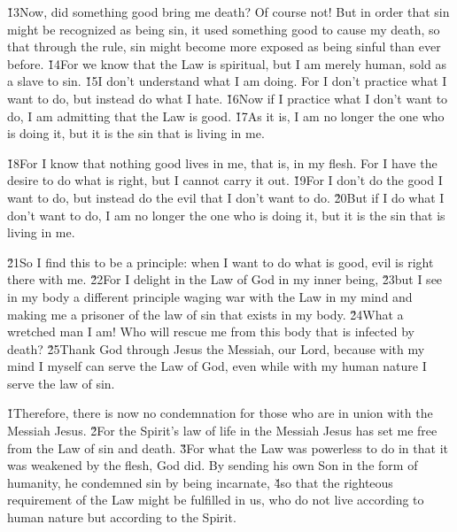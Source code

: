 \v{13}Now, did something good bring me death? Of course not! But in order that sin might be recognized as being sin, it used something good to cause my death, so that through the rule, sin might become more exposed as being sinful than ever before. \v{14}For we know that the Law is spiritual, but I am merely human, sold as a slave to sin. \v{15}I don't understand what I am doing. For I don't practice what I want to do, but instead do what I hate. \v{16}Now if I practice what I don't want to do, I am admitting that the Law is good. \v{17}As it is, I am no longer the one who is doing it, but it is the sin that is living in me.

\v{18}For I know that nothing good lives in me, that is, in my flesh. For I have the desire to do what is right, but I cannot carry it out. \v{19}For I don't do the good I want to do, but instead do the evil that I don't want to do. \v{20}But if I do what I don't want to do, I am no longer the one who is doing it, but it is the sin that is living in me.

\v{21}So I find this to be a principle: when I want to do what is good, evil is right there with me. \v{22}For I delight in the Law of God in my inner being, \v{23}but I see in my body a different principle waging war with the Law in my mind and making me a prisoner of the law of sin that exists in my body. \v{24}What a wretched man I am! Who will rescue me from this body that is infected by death? \v{25}Thank God through Jesus the Messiah, our Lord, because with my mind I myself can serve the Law of God, even while with my human nature I serve the law of sin.

\v{1}Therefore, there is now no condemnation for those who are in union with the Messiah Jesus. \v{2}For the Spirit's law of life in the Messiah Jesus has set me free from the Law of sin and death. \v{3}For what the Law was powerless to do in that it was weakened by the flesh, God did. By sending his own Son in the form of humanity, he condemned sin by being incarnate, \v{4}so that the righteous requirement of the Law might be fulfilled in us, who do not live according to human nature but according to the Spirit.

